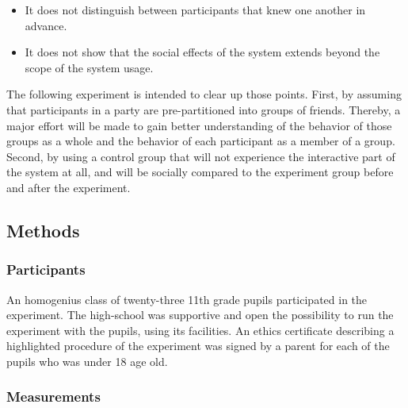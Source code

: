 \documentclass[a4paper,11pt]{article}
\begin{document}
{\begin{itemize}
	\item It does not distinguish between participants that knew one another in advance.
	\item It does not show that the social effects of the system extends beyond the scope of the system usage.
\end{itemize}

The following experiment is intended to clear up those points.
First, by assuming that participants in a party are pre-partitioned into groups of friends.
Thereby, a major effort will be made to gain better understanding of the behavior of those groups as a whole and the behavior of each participant as a member of a group.
Second, by using a control group that will not experience the interactive part of the system at all, and will be socially compared to the experiment group before and after the experiment.

\subsection{Methods}\label{methods:evaluation}

\subsubsection{Participants}

An homogenius class of twenty-three 11th grade pupils participated in the experiment.
The high-school was supportive and open the possibility to run the experiment with the pupils, using its facilities.
An ethics certificate describing a highlighted procedure of the experiment was signed by a parent for each of the pupils who was under 18 age old.

\subsubsection{Measurements}

}
\end{document}
